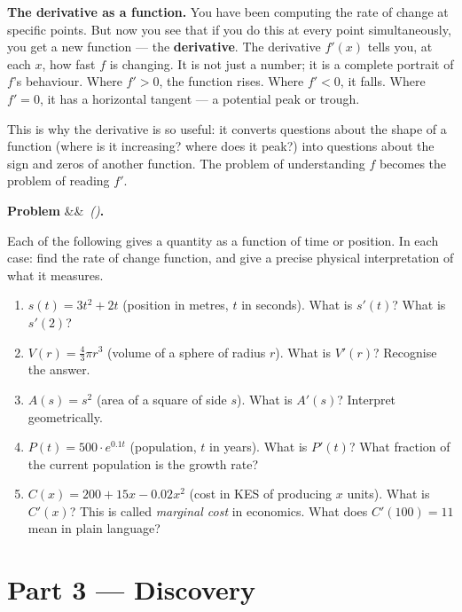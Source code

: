 \documentclass[12pt, a4paper]{article}
\newcounter{problem}
\newenvironment{problem}[1][]{%
  \refstepcounter{problem}%
  \par\vspace{6pt}%
  \noindent\textbf{\color{MidBlue}Problem \theproblem}%
  \ifx&#1&\else\ \textit{(#1)}\fi\textbf{.}\enskip
}{\par\vspace{4pt}}
\begin{document}
\begin{thought}
\textbf{The derivative as a function.}
You have been computing the rate of change at specific points. But now you see that if you do this at every point simultaneously, you get a new function --- the \textbf{derivative}. The derivative $f'(x)$ tells you, at each $x$, how fast $f$ is changing. It is not just a number; it is a complete portrait of $f$'s behaviour. Where $f' > 0$, the function rises. Where $f' < 0$, it falls. Where $f' = 0$, it has a horizontal tangent --- a potential peak or trough.

This is why the derivative is so useful: it converts questions about the shape of a function (where is it increasing? where does it peak?) into questions about the sign and zeros of another function. The problem of understanding $f$ becomes the problem of reading $f'$.
\end{thought}

\begin{problem}
\label{prob:physical_meaning}
Each of the following gives a quantity as a function of time or position. In each case: find the rate of change function, and give a precise physical interpretation of what it measures.

\begin{enumerate}[label=(\alph*), topsep=2pt]
  \item $s(t) = 3t^2 + 2t$ (position in metres, $t$ in seconds). What is $s'(t)$? What is $s'(2)$?
  \item $V(r) = \frac{4}{3}\pi r^3$ (volume of a sphere of radius $r$). What is $V'(r)$? Recognise the answer.
  \item $A(s) = s^2$ (area of a square of side $s$). What is $A'(s)$? Interpret geometrically.
  \item $P(t) = 500 \cdot e^{0.1t}$ (population, $t$ in years). What is $P'(t)$? What fraction of the current population is the growth rate?
  \item $C(x) = 200 + 15x - 0.02x^2$ (cost in KES of producing $x$ units). What is $C'(x)$? This is called \emph{marginal cost} in economics. What does $C'(100) = 11$ mean in plain language?
\end{enumerate}
\end{problem}

\section{Part 3 \texorpdfstring{---}{--} Discovery}
\end{document}
